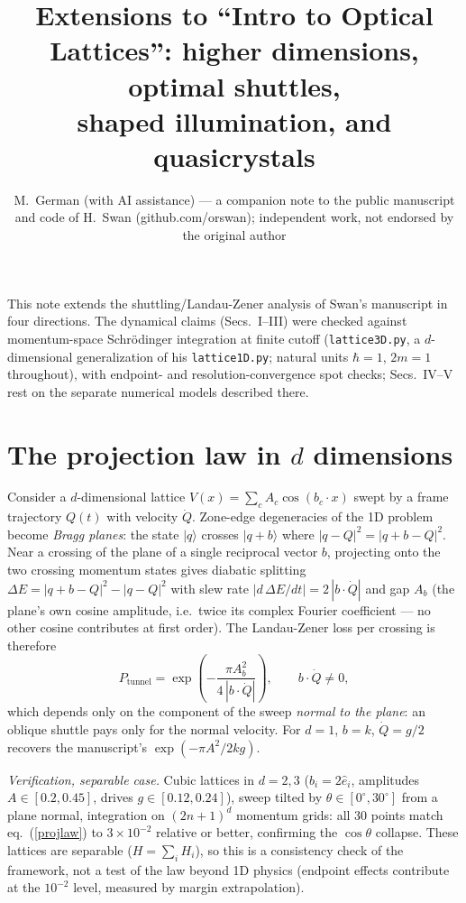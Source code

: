 \documentclass[aps,prb,floatfix,amsmath,amssymb,groupedaddress]{revtex4}
\begin{document}
\providecommand{\half}{{\frac{1}{2}}}

\title{Extensions to ``Intro to Optical Lattices'': higher dimensions, optimal shuttles,\\
shaped illumination, and quasicrystals}
\author{M.~German (with AI assistance) --- a companion note to the public
manuscript and code of H.~Swan (github.com/orswan); independent work, not
endorsed by the original author}
\maketitle

This note extends the shuttling/Landau-Zener analysis of Swan's manuscript in
four directions. The dynamical claims (Secs.~I--III) were checked against
momentum-space Schr\"odinger integration at finite cutoff
(\texttt{lattice3D.py}, a $d$-dimensional generalization of his
\texttt{lattice1D.py}; natural units $\hbar = 1$, $2m = 1$ throughout), with
endpoint- and resolution-convergence spot checks; Secs.~IV--V rest on the
separate numerical models described there.

\section{The projection law in $d$ dimensions}

Consider a $d$-dimensional lattice $V(x) = \sum_c A_c \cos(b_c \cdot x)$ swept
by a frame trajectory $Q(t)$ with velocity $\dot Q$. Zone-edge degeneracies of
the 1D problem become \emph{Bragg planes}: the state $|q\rangle$ crosses
$|q + b\rangle$ where $|q - Q|^2 = |q + b - Q|^2$. Near a crossing of the
plane of a single reciprocal vector $b$, projecting onto the two crossing
momentum states gives diabatic splitting $\Delta E = |q+b-Q|^2 - |q-Q|^2$ with
slew rate $|d\,\Delta E/dt| = 2\, |b \cdot \dot Q|$ and gap $A_b$ (the
plane's own cosine amplitude, i.e.\ twice its complex Fourier coefficient
--- no other cosine contributes at first order). The
Landau-Zener loss per crossing is therefore
\begin{equation}
P_{\text{tunnel}} = \exp\!\left(-\frac{\pi A_b^2}{4\, |b\cdot \dot Q|}\right),
\qquad b\cdot\dot Q \neq 0,
\label{projlaw}
\end{equation}
which depends only on the component of the sweep \emph{normal to the plane}:
an oblique shuttle pays only for the normal velocity. For $d{=}1$,
$b = k$, $\dot Q = g/2$ recovers the manuscript's
$\exp(-\pi A^2/2kg)$.

\emph{Verification, separable case.} Cubic lattices in $d = 2, 3$
($b_i = 2\hat e_i$, amplitudes $A \in [0.2, 0.45]$, drives
$g \in [0.12, 0.24]$), sweep tilted by $\theta \in [0^\circ, 30^\circ]$ from
a plane normal, integration on $(2n{+}1)^d$ momentum grids: all 30 points
match eq.~(\ref{projlaw}) to $3\times10^{-2}$ relative or better, confirming
the $\cos\theta$ collapse. These lattices are separable ($H = \sum_i H_i$), so
this is a consistency check of the framework, not a test of the law beyond
1D physics (endpoint effects contribute at the $10^{-2}$ level, measured by
margin extrapolation).
\end{document}

